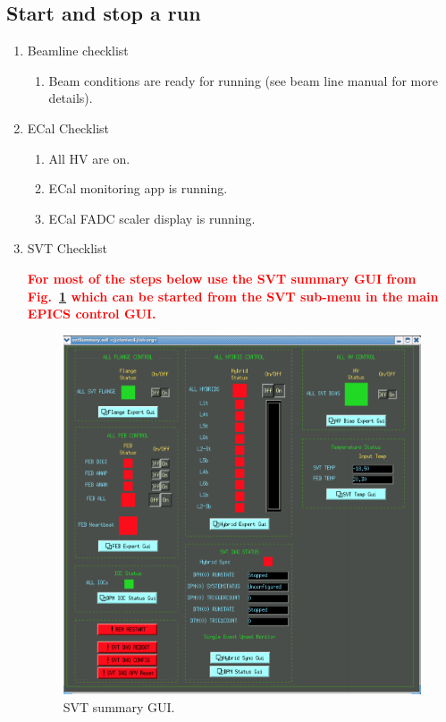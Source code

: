 \documentclass[12pt]{article}
\begin{document}
\subsection{Start and stop a run}
\label{sec:startstop}

\begin{enumerate}
\item
Beamline checklist
\begin{enumerate}
\item
Beam conditions are ready for running (see beam line manual for more details).
\end{enumerate}
\item    ECal Checklist
\begin{enumerate}
\item
All HV are on.
\item
ECal monitoring app is running.
\item
ECal FADC scaler display is running.
\end{enumerate}
\item
\label{item:svt-checklist}
SVT Checklist \newline

{\bf \textcolor{red}{
For most of the steps below use the SVT summary GUI from Fig.~\ref{fig:svt_summary_gui} which can be started from the SVT sub-menu in the 
main EPICS control GUI.}}
\begin{figure}[htbp]
\begin{center}
    \includegraphics[width=\textwidth]{svt_summary_gui.png}
\caption{SVT summary GUI.}
\label{fig:svt_summary_gui}
\end{center}
\vspace*{-5mm}
\end{figure}
\begin{enumerate}


\end{enumerate}
\end{enumerate}
\end{document}

